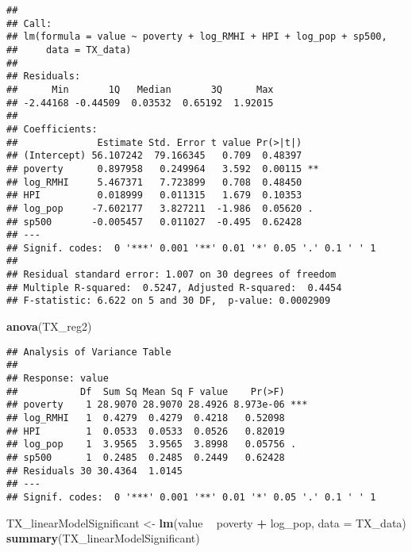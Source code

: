\documentclass[
]{article}
\newenvironment{Shaded}{\begin{snugshade}}{\end{snugshade}}
\newcommand{\DataTypeTok}[1]{\textcolor[rgb]{0.13,0.29,0.53}{#1}}
\newcommand{\KeywordTok}[1]{\textcolor[rgb]{0.13,0.29,0.53}{\textbf{#1}}}
\newcommand{\NormalTok}[1]{#1}
\newcommand{\OperatorTok}[1]{\textcolor[rgb]{0.81,0.36,0.00}{\textbf{#1}}}
\newcommand{\StringTok}[1]{\textcolor[rgb]{0.31,0.60,0.02}{#1}}
\begin{document}
\begin{verbatim}
## 
## Call:
## lm(formula = value ~ poverty + log_RMHI + HPI + log_pop + sp500, 
##     data = TX_data)
## 
## Residuals:
##      Min       1Q   Median       3Q      Max 
## -2.44168 -0.44509  0.03532  0.65192  1.92015 
## 
## Coefficients:
##              Estimate Std. Error t value Pr(>|t|)   
## (Intercept) 56.107242  79.166345   0.709  0.48397   
## poverty      0.897958   0.249964   3.592  0.00115 **
## log_RMHI     5.467371   7.723899   0.708  0.48450   
## HPI          0.018999   0.011315   1.679  0.10353   
## log_pop     -7.602177   3.827211  -1.986  0.05620 . 
## sp500       -0.005457   0.011027  -0.495  0.62428   
## ---
## Signif. codes:  0 '***' 0.001 '**' 0.01 '*' 0.05 '.' 0.1 ' ' 1
## 
## Residual standard error: 1.007 on 30 degrees of freedom
## Multiple R-squared:  0.5247, Adjusted R-squared:  0.4454 
## F-statistic: 6.622 on 5 and 30 DF,  p-value: 0.0002909
\end{verbatim}

\begin{Shaded}
\begin{Highlighting}[]
\KeywordTok{anova}\NormalTok{(TX_reg2)}
\end{Highlighting}
\end{Shaded}

\begin{verbatim}
## Analysis of Variance Table
## 
## Response: value
##           Df  Sum Sq Mean Sq F value    Pr(>F)    
## poverty    1 28.9070 28.9070 28.4926 8.973e-06 ***
## log_RMHI   1  0.4279  0.4279  0.4218   0.52098    
## HPI        1  0.0533  0.0533  0.0526   0.82019    
## log_pop    1  3.9565  3.9565  3.8998   0.05756 .  
## sp500      1  0.2485  0.2485  0.2449   0.62428    
## Residuals 30 30.4364  1.0145                      
## ---
## Signif. codes:  0 '***' 0.001 '**' 0.01 '*' 0.05 '.' 0.1 ' ' 1
\end{verbatim}

\begin{Shaded}
\begin{Highlighting}[]
\NormalTok{TX_linearModelSignificant <-}\StringTok{ }\KeywordTok{lm}\NormalTok{(value }\OperatorTok{~}\StringTok{ }\NormalTok{poverty }\OperatorTok{+}\StringTok{ }\NormalTok{log_pop, }\DataTypeTok{data =}\NormalTok{ TX_data)}
\KeywordTok{summary}\NormalTok{(TX_linearModelSignificant)}
\end{Highlighting}
\end{Shaded}
\end{document}
